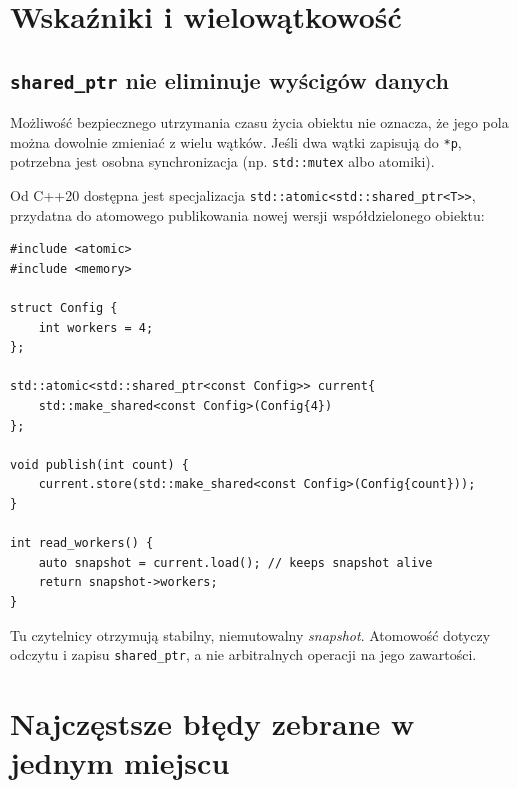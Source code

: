 \section{Wskaźniki i wielowątkowość}

\subsection{\texttt{shared\_ptr} nie eliminuje wyścigów danych}

Możliwość bezpiecznego utrzymania czasu życia obiektu nie oznacza,
że jego pola można dowolnie zmieniać z wielu wątków.
Jeśli dwa wątki zapisują do \texttt{*p}, potrzebna jest osobna
synchronizacja (np. \texttt{std::mutex} albo atomiki).

Od C++20 dostępna jest specjalizacja
\texttt{std::atomic<std::shared\_ptr<T>>}, przydatna do atomowego
publikowania nowej wersji współdzielonego obiektu:

\begin{lstlisting}
#include <atomic>
#include <memory>

struct Config {
    int workers = 4;
};

std::atomic<std::shared_ptr<const Config>> current{
    std::make_shared<const Config>(Config{4})
};

void publish(int count) {
    current.store(std::make_shared<const Config>(Config{count}));
}

int read_workers() {
    auto snapshot = current.load(); // keeps snapshot alive
    return snapshot->workers;
}
\end{lstlisting}

Tu czytelnicy otrzymują stabilny, niemutowalny \emph{snapshot}.
Atomowość dotyczy odczytu i zapisu \texttt{shared\_ptr},
a nie arbitralnych operacji na jego zawartości.

\section{Najczęstsze błędy zebrane w jednym miejscu}

